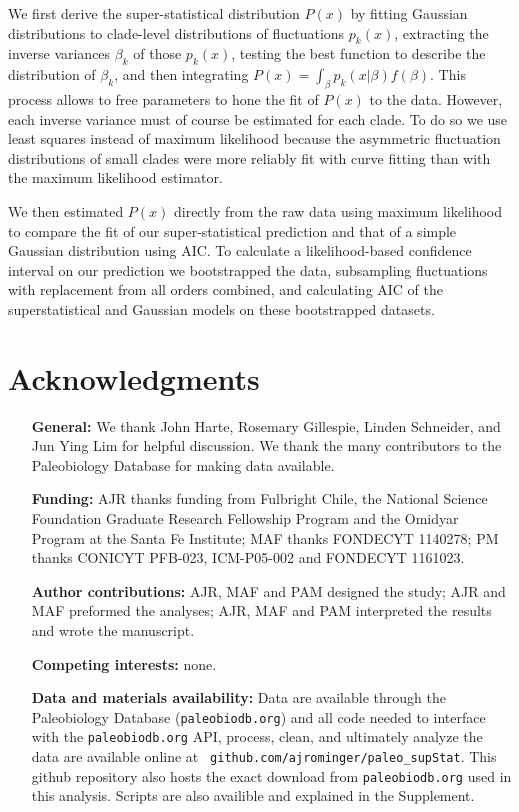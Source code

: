 \documentclass[12pt]{article}
\begin{document}
We first derive the super-statistical distribution $P(x)$ by fitting
Gaussian distributions to clade-level distributions of fluctuations
$p_k(x)$, extracting the inverse variances $\beta_k$ of those
$p_k(x)$, testing the best function to describe the distribution of
$\beta_k$, and then integrating
$P(x) = \int_{\beta}p_k(x | \beta) f(\beta)$. This process allows to
free parameters to hone the fit of $P(x)$ to the data.  However, each
inverse variance must of course be estimated for each clade.  To do so
we use least squares instead of maximum likelihood because the
asymmetric fluctuation distributions of small clades were more
reliably fit with curve fitting than with the maximum likelihood
estimator.

We then estimated $P(x)$ directly from the raw data using maximum
likelihood to compare the fit of our super-statistical prediction and
that of a simple Gaussian distribution using AIC. To calculate a
likelihood-based confidence interval on our prediction we bootstrapped
the data, subsampling fluctuations with replacement from all orders
combined, and calculating AIC of the superstatistical and Gaussian
models on these bootstrapped datasets.





\section*{Acknowledgments}
\begin{itemize}
\item[{\bf General:}] We thank John Harte, Rosemary Gillespie, Linden
  Schneider, and Jun Ying Lim for helpful discussion. We thank the
  many contributors to the Paleobiology Database for making data
  available.
\item[{\bf Funding:}] AJR thanks funding from Fulbright Chile, the
  National Science Foundation Graduate Research Fellowship Program and
  the Omidyar Program at the Santa Fe Institute; MAF thanks FONDECYT
  1140278; PM thanks CONICYT PFB-023, ICM-P05-002 and FONDECYT
  1161023.
\item[{\bf Author contributions:}] AJR, MAF and PAM designed the
  study; AJR and MAF preformed the analyses; AJR, MAF and PAM
  interpreted the results and wrote the manuscript.
\item[{\bf Competing interests:}] none.
\item[{\bf Data and materials availability:}] Data are available
  through the Paleobiology Database ({\tt paleobiodb.org}) and all
  code needed to interface with the {\tt paleobiodb.org} API, process,
  clean, and ultimately analyze the data are available online at {\tt
    github.com/ajrominger/paleo\_supStat}. This github repository also
  hosts the exact download from {\tt paleobiodb.org} used in this
  analysis. Scripts are also availible and explained in the
  Supplement.
\end{itemize}
\end{document}
